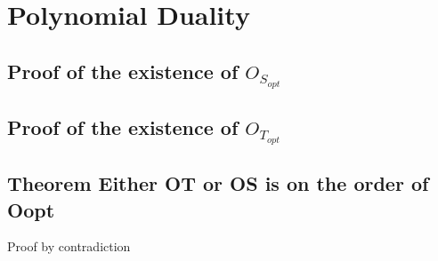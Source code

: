 \documentclass[11pt]{article}
\begin{document}
\newpage
\section{Polynomial Duality}
\subsection{Proof of the existence of $O_{S_{opt}}$}
\subsection{Proof of the existence of $O_{T_{opt}}$}












\subsection{Theorem Either OT or OS is on the order of Oopt}
Proof by contradiction
\end{document}

